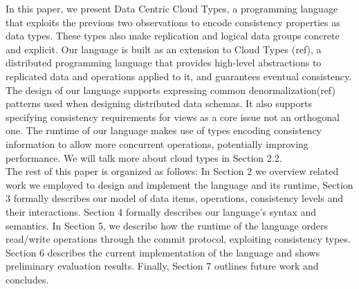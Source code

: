 In this paper, we present Data Centric Cloud Types, a programming language that
exploits the previous two observations to encode consistency properties as data
types. These types also make replication and logical data groups concrete and
explicit. Our language is built as an extension to Cloud Types (ref), 
a distributed programming language that provides high-level abstractions to replicated
data and operations applied to it, and guarantees eventual consistency. 
The design of our language supports expressing common denormalization(ref) patterns used when designing distributed
data schemas. It also supports specifying consistency requirements for views as
a core issue not an orthogonal one. The runtime of our language makes use of
types encoding 
consistency information to allow more concurrent operations, potentially
improving performance. We will talk more about cloud types in Section 2.2. \\

The rest of this paper is organized as follows: In Section 2 we overview related
work we employed to design and implement the language and its runtime,
Section 3 formally describes our model of data items, operations, consistency
levels and their interactions. Section 4 formally describes our language's syntax and
semantics. In Section 5, we describe how the runtime of the language orders
read/write operations through the commit protocol, exploiting consistency types. 
Section 6 describes the current implementation of the language and shows preliminary evaluation
results. Finally, Section 7 outlines future work and concludes. 







